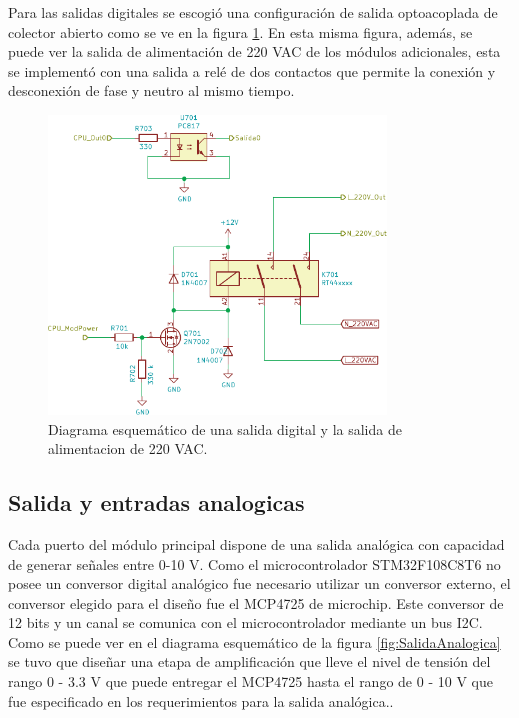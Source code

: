Para las salidas digitales se escogió una configuración de salida optoacoplada de colector abierto como se ve en la figura \ref{fig:SalidaDigital}. En esta misma figura, además, se puede ver la salida de alimentación de 220 VAC de los módulos adicionales, esta se implementó con una salida a relé de dos contactos que permite la conexión y desconexión de fase y neutro al mismo tiempo.

\begin{figure}[H]
	\centering
	\includegraphics[width=0.8\textwidth]{./Figures/SalidaDigital.pdf}
	\caption{Diagrama esquemático de una salida digital y la salida de alimentacion de 220 VAC.}
	\label{fig:SalidaDigital}
\end{figure}

\subsection{Salida y entradas analogicas}

Cada puerto del módulo principal dispone de una salida analógica con capacidad de generar señales entre 0-10 V. Como el microcontrolador STM32F108C8T6 no posee un conversor digital analógico fue necesario utilizar un conversor externo, el conversor elegido para el diseño fue el MCP4725 de microchip. Este conversor de 12 bits y un canal se comunica con el microcontrolador mediante un bus I2C. 
Como se puede ver en el diagrama esquemático de la figura \ref{fig:SalidaAnalogica} se tuvo que diseñar una etapa de amplificación que lleve el nivel de tensión del rango 0 - 3.3 V que puede entregar el MCP4725 hasta el rango de 0 - 10 V que fue especificado en los requerimientos para la salida analógica..

